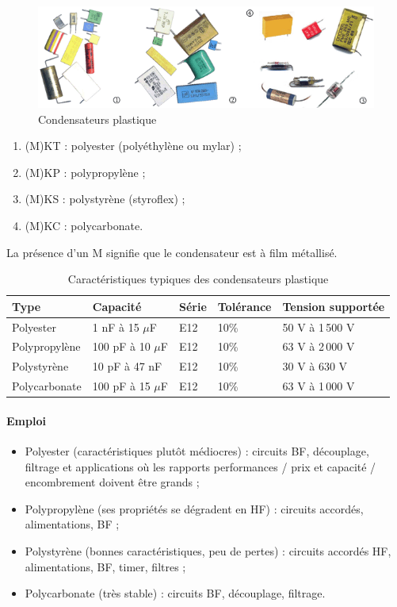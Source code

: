 \documentclass[a4paper]{article}
\begin{document}
\begin{figure}[H]
	\centering
	\includegraphics[scale=0.75]{Images/Condensateurs_plastique.png}
	\caption{Condensateurs plastique
		\label{Condensateurs_plastique}}
\end{figure}

\begin{enumerate}
	\item (M)KT : polyester (polyéthylène ou mylar) ;
	\item (M)KP : polypropylène ;
	\item (M)KS : polystyrène (styroflex) ;
	\item (M)KC : polycarbonate.
\end{enumerate}

La présence d'un \og{}M\fg{} signifie que le condensateur est à film métallisé.

\begin{table}[H]
	\centering
		\begin{tabular}{|l|l|l|l|l|}\hline
				Type & Capacité & Série & Tolérance & Tension supportée\\\hline\hline
				Polyester & 1 nF à 15 $\mu$F & E12 & 10\% & 50 V à 1\,500 V\\\hline
				Polypropylène & 100 pF à 10 $\mu$F & E12 & 10\% & 63 V à 2\,000 V\\\hline
				Polystyrène & 10 pF à 47 nF & E12 & 10\% & 30 V à 630 V\\\hline
				Polycarbonate & 100 pF à 15 $\mu$F & E12 & 10\% & 63 V à 1\,000 V\\\hline
		\end{tabular}
		\caption{Caractéristiques typiques des condensateurs plastique
			\label{Caracteristiques_des_condensateurs_plastique}}
\end{table}

\paragraph{Emploi}

\begin{itemize}
	\item Polyester (caractéristiques plutôt médiocres) : circuits BF, découplage, filtrage et applications où les rapports performances / prix et capacité / encombrement doivent être grands ;
	\item Polypropylène (ses propriétés se dégradent en HF) : circuits accordés, alimentations, BF ;
	\item Polystyrène (bonnes caractéristiques, peu de pertes) : circuits accordés HF, alimentations, BF, timer, filtres ;
	\item Polycarbonate (très stable) : circuits BF, découplage, filtrage.
\end{itemize}
\end{document}
